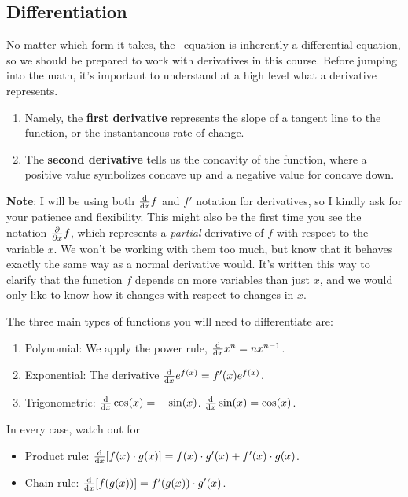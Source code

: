 \subsection{Differentiation} \label{sec:diff}
No matter which form it takes, the \Sch\ equation is inherently a differential equation, so we should be prepared to work with derivatives in this course. Before jumping into the math, it's important to understand at a high level what a derivative represents. \par 
\begin{enumerate}[1.]
	\item Namely, the \textbf{first derivative} represents the slope of a tangent line to the function, or the instantaneous rate of change.
	\item The \textbf{second derivative} tells us the concavity of the function, where a positive value symbolizes concave up and a negative value for concave down.
\end{enumerate} 

\textbf{Note}: I will be using both $\dv{x} f$ and $f'$ notation for derivatives, so I kindly ask for your patience and flexibility. This might also be the first time you see the notation $\pdv{x} f$, which represents a \emph{partial} derivative of $f$ with respect to the variable $x$. We won't be working with them too much, but know that it behaves exactly the same way as a normal derivative would. It's written this way to clarify that the function $f$ depends on more variables than just $x$, and we would only like to know how it changes with respect to changes in $x$. \par 

The three main types of functions you will need to differentiate are:
\begin{enumerate}[1.]
	\item Polynomial: We apply the power rule, $\dv{x} x^n = nx^{n-1}$.
	\item Exponential: The derivative $ \dv{x} e^{f(x)} = f'(x)e^{f(x)}$.
	\item Trigonometric: $\dv{x} \cos(x) = -\sin(x)$. $\dv{x} \sin(x) = \cos(x)$. 
\end{enumerate}

In every case, watch out for 
\begin{itemize}
	\item Product rule: $\dv{x} [f(x)\cdot g(x)] = f(x)\cdot g'(x) + f'(x)\cdot g(x)$.
	\item Chain rule: $\dv{x} [f(g(x))] = f'(g(x)) \cdot g'(x)$.
\end{itemize}

